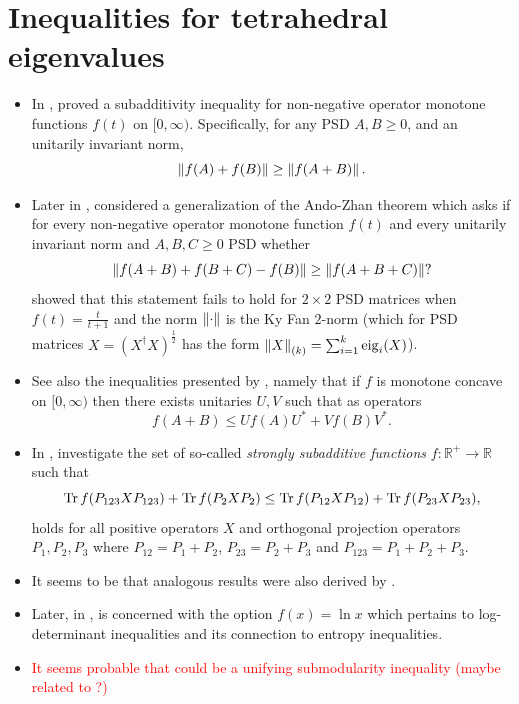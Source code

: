 \documentclass[notitlepage, 10pt]{article}
\begin{document}
\section{Inequalities for tetrahedral eigenvalues}

\begin{itemize}
    \item In \cite{ando1999norm}, \citeauthor{ando1999norm} proved a subadditivity inequality for non-negative operator monotone functions $f(t)$ on $[0, \infty)$.
        Specifically, for any PSD $A,B \geq 0$, and an unitarily invariant norm,
        \begin{equation}
            \left\lVert f(A) + f(B)\right\rVert \geq \left\lVert f(A+B)\right\rVert.
        \end{equation}
    \item Later in \cite{kosem2006inequalities}, \citeauthor{kosem2006inequalities} considered a generalization of the Ando-Zhan theorem which asks if for every non-negative operator monotone function $f(t)$ and every unitarily invariant norm and $A,B,C \geq 0$ PSD whether
        \begin{equation}
            \left\lVert f(A+B) + f(B+C) - f(B)\right\rVert \geq \left\lVert f(A+B+C)\right\rVert?
        \end{equation}
        \citeauthor{kosem2006inequalities} showed that this statement fails to hold for $2\times 2$ PSD matrices when $f(t) = \frac{t}{t+1}$ and the norm $\left\lVert\cdot\right\rVert$ is the Ky Fan $2$-norm (which for PSD matrices $X = (X^{\dagger} X)^{\frac{1}{2}}$ has the form $\left\lVert X\right\rVert_{(k)} = \sum_{i=1}^{k}\operatorname{eig}_i(X)$).
    \item See also the inequalities presented by \citeauthor{aujla2007eigenvalue} \cite{aujla2007eigenvalue}, namely that if $f$ is monotone concave on $[0,\infty)$ then there exists unitaries $U,V$ such that as operators
        \begin{equation}
            f(A+B) \leq Uf(A)U^{*} + V f(B) V^{*}.
        \end{equation}
    \item In \cite{audenaert2010strongly}, \citeauthor{audenaert2010strongly} investigate the set of so-called \textit{strongly subadditive functions} $f : \mathbb R^{+} \to \mathbb R$ such that
        \begin{equation}
            \operatorname{Tr} f(P_{123}XP_{123}) + \operatorname{Tr} f(P_{2}XP_{2}) \leq \operatorname{Tr} f(P_{12}XP_{12}) + \operatorname{Tr} f(P_{23}XP_{23}),
        \end{equation}
        holds for all positive operators $X$ and orthogonal projection operators $P_{1},P_{2},P_{3}$ where $P_{12} = P_{1} + P_{2}$, $P_{23} = P_{2} + P_{3}$ and $P_{123} = P_1 + P_2 + P_3$.
    \item It seems to be that analogous results were also derived by \citeauthor{friedland2013submodular} \cite{friedland2013submodular}.
    \item Later, in \cite{lami2017log}, \citeauthor{lami2017log} is concerned with the option $f(x) = \ln x$ which pertains to log-determinant inequalities and its connection to entropy inequalities.
    \item \textcolor{red}{It seems probable that could be a unifying submodularity inequality (maybe related to \cite{gao2017unifying}?)}
\end{itemize}
\end{document}

